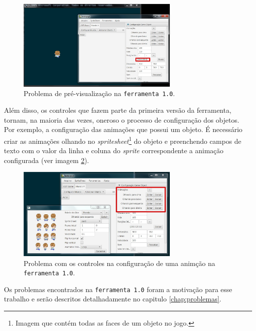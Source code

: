 \documentclass[12pt,twoside,openright,a4paper,english,brazil,sumario=tradicional]{abntex2}
\begin{document}
\begin{figure}[htb]
\label{fig:intro-problema-1}
\centering
\includegraphics[width=0.7\textwidth]{images/problema-1.jpg}
\caption{Problema de pré-visualização na \texttt{ferramenta 1.0}.}
\end{figure}

Além disso, os controles que fazem parte da primeira versão da ferramenta, tornam, na maioria das vezes, oneroso o processo de configuração dos objetos. Por exemplo, a configuração das animações que possui um objeto. É necessário criar as animações olhando no \emph{spritesheet}\footnote{Imagem que contém todas as faces de um objeto no jogo.} do objeto e preenchendo campos de texto com o valor da linha e coluna do \emph{sprite} correspondente a animação configurada (ver imagem \ref{fig:intro-problema-2}).

\begin{figure}[htb]
\label{fig:intro-problema-2}
\centering
\includegraphics[width=0.7\textwidth]{images/problema-2.jpg}
\caption{Problema com os controles na configuração de uma animção na \texttt{ferramenta 1.0}.}
\end{figure}

Os problemas encontrados na \texttt{ferramenta 1.0} foram a motivação para esse trabalho e serão descritos detalhadamente no capitulo \ref{chap:problemas}.
\end{document}
